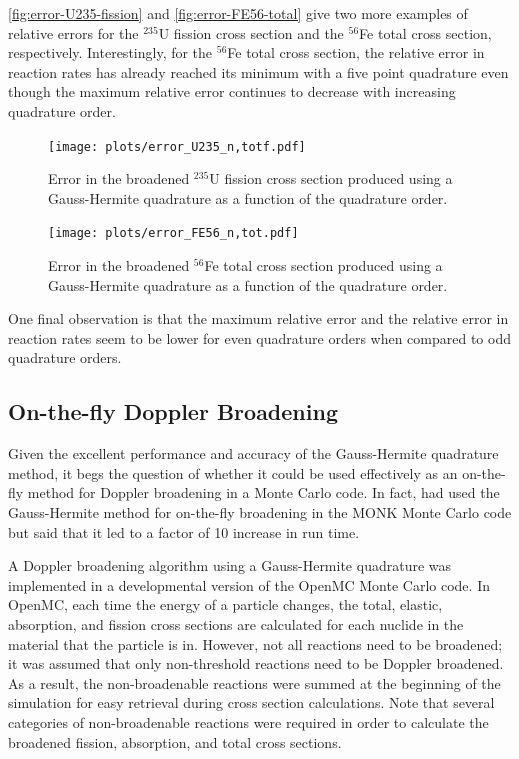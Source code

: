 \documentclass[3p,authoryear]{elsarticle}
\begin{document}
\autoref{fig:error-U235-fission} and \autoref{fig:error-FE56-total} give two
more examples of relative errors for the $^{235}$U fission cross section and the
$^{56}$Fe total cross section, respectively. Interestingly, for the $^{56}$Fe
total cross section, the relative error in reaction rates has already reached
its minimum with a five point quadrature even though the maximum relative error
continues to decrease with increasing quadrature order.
\begin{figure}[H]
  \centering
  \texttt{[image: plots/error\_U235\_n,totf.pdf]}
  \caption{Error in the broadened $^{235}$U fission cross section produced using a
    Gauss-Hermite quadrature as a function of the quadrature order.}
  \label{fig:error-U235-fission}
\end{figure}
\begin{figure}[H]
  \centering
  \texttt{[image: plots/error\_FE56\_n,tot.pdf]}
  \caption{Error in the broadened $^{56}$Fe total cross section produced using a
    Gauss-Hermite quadrature as a function of the quadrature order.}
  \label{fig:error-FE56-total}
\end{figure}

One final observation is that the maximum relative error and the relative error
in reaction rates seem to be lower for even quadrature orders when compared to
odd quadrature orders.

\subsection{On-the-fly Doppler Broadening}

Given the excellent performance and accuracy of the Gauss-Hermite quadrature
method, it begs the question of whether it could be used effectively as an
on-the-fly method for Doppler broadening in a Monte Carlo code. In fact,
\citet{nd-dean-2010} had used the Gauss-Hermite method for on-the-fly broadening
in the MONK Monte Carlo code but said that it led to a factor of 10 increase in
run time.

A Doppler broadening algorithm using a Gauss-Hermite quadrature was implemented
in a developmental version of the OpenMC Monte Carlo code. In OpenMC, each time
the energy of a particle changes, the total, elastic, absorption, and fission
cross sections are calculated for each nuclide in the material that the particle
is in. However, not all reactions need to be broadened; it was assumed that only
non-threshold reactions need to be Doppler broadened. As a result, the
non-broadenable reactions were summed at the beginning of the simulation for
easy retrieval during cross section calculations. Note that several categories
of non-broadenable reactions were required in order to calculate the broadened
fission, absorption, and total cross sections.
\end{document}
